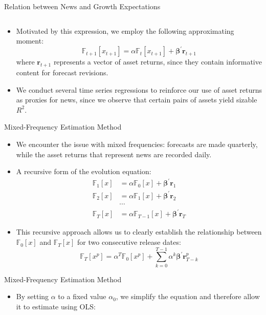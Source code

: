 \documentclass[UTF8, 10pt]{beamer}
\begin{document}
\begin{CJK*}{UTF8}{gbsn}
\begin{frame}{Relation between News and Growth Expectations}
\begin{itemize}
$$			$$
		\item Motivated by this expression, we employ the following approximating moment:
			$$
			\mathbb{F}_{t+1}\left[x_{t+1}\right]
		    = \alpha \mathbb{F}_{t}\left[x_{t+1}\right] 
		    + \boldsymbol{\beta}^{\prime}\mathbf{r}_{t+1}
			$$
			where $\mathbf{r}_{t+1}$ represents a vector of \alert{asset returns},
			since they contain informative content for forecast revisions.
		\item We conduct several time series regressions to reinforce our use of \alert{asset returns as proxies for news}, since we observe that certain pairs of assets yield sizable $R^2$.
	\end{itemize}
\end{frame}
\begin{frame}{Mixed-Frequency Estimation Method}
	\begin{itemize}
		\item We encounter the \alert{issue with mixed frequencies}: forecasts are made quarterly, while the asset returns that represent news are recorded daily.
		\item A \alert{recursive form} of the evolution equation:
			$$
			\begin{aligned}
		       \mathbb{F}_{1}\left[x\right]
		        & = \alpha \mathbb{F}_{0}\left[x\right] 
		        + \boldsymbol{\beta}^{\prime}\mathbf{r}_{1} 
		        \\
		        \mathbb{F}_{2}\left[x\right]
		        & = \alpha \mathbb{F}_{1}\left[x\right] 
		        + \boldsymbol{\beta}^{\prime}\mathbf{r}_{2} 
		        \\
		        &\cdots
		        \\
		        \mathbb{F}_{T}\left[x\right]
		        & = \alpha \mathbb{F}_{T-1}\left[x\right] 
		        + \boldsymbol{\beta}^{\prime}\mathbf{r}_{T}
		    \end{aligned}
			$$
		\item This recursive approach allows us to clearly establish the relationship between $\mathbb{F}_{0}\left[x\right]$ and $\mathbb{F}_{T}\left[x\right]$ for two consecutive release dates:
			$$
			\mathbb{F}_{T}\left[x^p\right]
		    = \alpha^T \mathbb{F}_{0}\left[x^p\right]
		    + \sum_{k=0}^{T-1} \alpha^k \boldsymbol{\beta}^{\prime}\mathbf{r}_{T-k}^p
			$$
	\end{itemize}
\end{frame}
\begin{frame}{Mixed-Frequency Estimation Method}
	\begin{itemize}
		\item By setting $\alpha$ to \alert{a fixed value $\alpha_0$}, we simplify the equation and therefore allow it to estimate using OLS:

\end{itemize}
\end{frame}
\end{CJK*}
\end{document}
